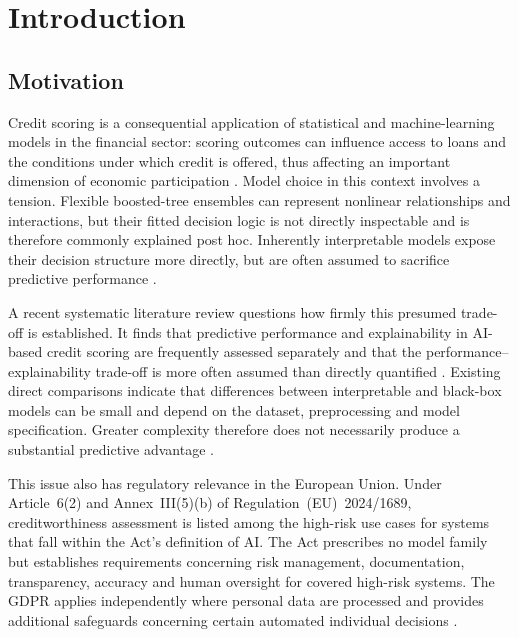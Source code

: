 \chapter{Introduction}

\section{Motivation}

Credit scoring is a consequential application of statistical and machine-learning
models in the financial sector: scoring outcomes can influence access to loans and
the conditions under which credit is offered, thus affecting an important dimension
of economic participation
\citep{bahloolPerformanceFairnessExplainability2026}. Model choice in this context
involves a tension. Flexible boosted-tree ensembles can represent nonlinear
relationships and interactions, but their fitted decision logic is not directly
inspectable and is therefore commonly explained post hoc. Inherently interpretable
models expose their decision structure more directly, but are often assumed to
sacrifice predictive performance
\citep{rudinStopExplainingBlack2019a, dessainCostExplainabilityAI2023}.

A recent systematic literature review questions how firmly this presumed trade-off is
established. It finds that predictive performance and explainability in AI-based credit
scoring are frequently assessed separately and that the
performance--explainability trade-off is more often assumed than directly quantified
\citep{bahloolPerformanceFairnessExplainability2026}. Existing direct comparisons
indicate that differences between interpretable and black-box models can be small and
depend on the dataset, preprocessing and model specification. Greater complexity
therefore does not necessarily produce a substantial predictive advantage
\citep{dessainCostExplainabilityAI2023,
amekoeExploringAccuracyInterpretability2024b}.

This issue also has regulatory relevance in the European Union. Under
Article~6(2) and Annex~III(5)(b) of Regulation~(EU)~2024/1689, creditworthiness
assessment is listed among the high-risk use cases for systems that fall within the
Act's definition of AI. The Act prescribes no model family but establishes requirements
concerning risk management, documentation, transparency, accuracy and human oversight
for covered high-risk systems. The GDPR applies independently where personal data are
processed and provides additional safeguards concerning certain automated individual
decisions \citep{mullerAIbasedCreditScoring2025, EUAIAct2024}.

